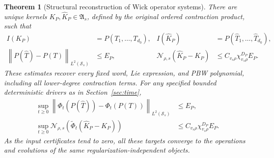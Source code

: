 \documentclass[11pt,a4paper]{amsart}
\numberwithin{equation}{section}
\newtheorem{theorem}{Theorem}[section]
\theoremstyle{definition}
\theoremstyle{remark}
\newcommand{\Sch}{\mathcal S}
\newcommand{\Alg}{\mathfrak A}
\newcommand{\norm}[1]{\left\lVert#1\right\rVert}
\newcommand{\Nn}[2]{\mathcal N_{#1,s}(#2)}
\begin{document}
\begin{theorem}[Structural reconstruction of Wick operator systems]\label{thm:wick_pipeline}
There are unique kernels $K_P,\widehat K_P\in\Alg_s$, defined by the original ordered contraction product, such that
\begin{align}
 I(K_P)&=P(T_1,\ldots,T_{d_0}),&
 I(\widehat K_P)&=P(\widehat T_1,\ldots,\widehat T_{d_0}),\label{eq:wick_pipeline_identity}\\
 \norm{P(\widehat T)-P(T)}_{L^2(\Sch_s)}&\le E_P,&
 \Nn\rho{\widehat K_P-K_P}&\le C_{v_s\rho}\chi_{v_s\rho}^{D_P}E_P.
 \label{eq:wick_pipeline_output}
\end{align}
These estimates recover every fixed word, Lie expression, and PBW polynomial, including all lower-degree contraction terms. For any specified bounded deterministic drivers as in Section~\ref{sec:time},
\begin{align}
 \sup_{t\ge0}\norm{\Phi_t(P(\widehat T))-\Phi_t(P(T))}_{L^2(\Sch_s)}
 &\le E_P,\label{eq:wick_pipeline_time}\\
 \sup_{t\ge0}\Nn\rho{\widetilde\Phi_t(\widehat K_P-K_P)}
 &\le C_{v_s\rho}\chi_{v_s\rho}^{D_P}E_P.
 \label{eq:wick_pipeline_time_native}
\end{align}
As the input certificates tend to zero, all these targets converge to the operations and evolutions of the same regularization-independent objects.
\end{theorem}
\end{document}
